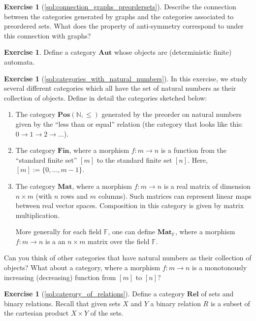 \documentclass[a4paper,11pt, oneside,titlepage=false]{scrbook}
\theoremstyle{plain}
\theoremstyle{definition}
\newtheorem{exer}[thm]{Exercise}
\newcommand{\Catb}[1]{\mathbf{#1}}
\newcommand{\POS}{\Catb{Pos}}
\newcommand{\MAT}{\Catb{Mat}}
\newcommand{\SKELFINSET}{\Catb{Fin}}
\newcommand{\REL}{\Catb{Rel}}
\newcommand{\NN}{\ensuremath{\mathbb{N}}}
\begin{document}
\begin{exer}[\cref{sol:connection_graphs_preordersets}] \label{exer:connection_graphs_preordersets}
Describe the connection between the categories generated by graphs and the categories associated to preordered sets. What does the property of anti-symmetry correspond to under this connection with graphs?
\end{exer}

\begin{exer} Define a category $\Catb{Aut}$ whose objects are (deterministic finite) automata. 
\end{exer}

\begin{exer}[\cref{sol:categories_with_natural_numbers}] \label{exer:categories_with_natural_numbers}
  In this exercise, we study several different categories which all have the set of natural numbers as their collection of objects.
  Define in detail the categories sketched below:
  \begin{enumerate}
  \item The category $\POS(\NN, \leq)$ generated by the preorder on natural numbers given by the ``less than or equal'' relation (the category that looks like this: $0 \to 1 \to 2 \to \ldots$).
  \item The category $\SKELFINSET$, where a morphism $f : m \to n$ is a function from the ``standard finite set'' $[m]$ to the standard finite set $[n]$. Here, $[m] := \{0,\ldots,m-1\}$.
  \item The category $\MAT$, where a morphism $f : m \to n$ is a real matrix of dimension $n \times m$ (with $n$ rows and $m$ columns).
    Such matrices can represent linear maps between real vector spaces.
    Composition in this category is given by matrix multiplication.

    More generally for each field $\mathbb{F}$, one can define $\MAT_\mathbb{F}$, where a morphism $f : m \to n$ is a an $n \times m$ matrix over the field $\mathbb{F}$.
  \end{enumerate}

  Can you think of other categories that have natural numbers as their collection of objects? What about a category, where a morphism $f : m \to n$ is a monotonously increasing (decreasing) function from $[m]$ to $[n]$?
\end{exer}

\begin{exer}[\cref{sol:category_of_relations}] \label{exer:category_of_relations}
  Define a category $\REL$ of sets and binary relations. Recall that given sets $X$ and $Y$ a binary relation $R$ is a subset of the cartesian product $X \times Y$ of the sets.
\end{exer}
\end{document}
